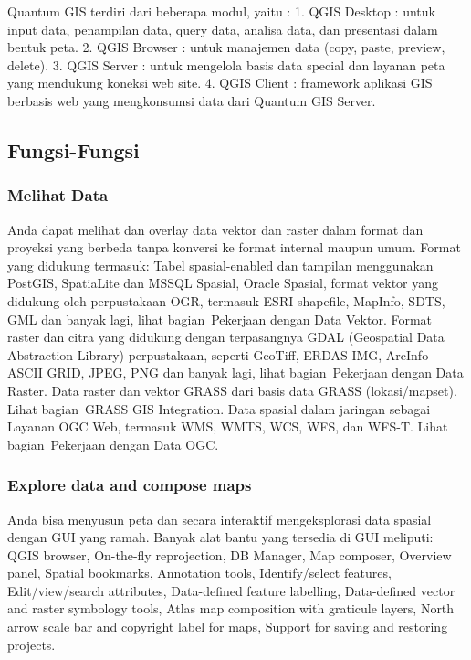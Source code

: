 	Quantum GIS terdiri dari beberapa modul, yaitu :
	1.	QGIS Desktop : untuk input data, penampilan data, query data, analisa data, dan presentasi dalam bentuk peta.
	2.	QGIS Browser : untuk manajemen data (copy, paste, preview, delete).
	3.	QGIS Server : untuk mengelola basis data special dan layanan peta yang mendukung koneksi web site.
	4.	QGIS Client : framework aplikasi GIS berbasis web yang mengkonsumsi data dari Quantum GIS Server.

\subsection{Fungsi-Fungsi}
	\subsubsection {Melihat Data}
	Anda dapat melihat dan overlay data vektor dan raster dalam format dan proyeksi yang berbeda tanpa konversi ke format internal maupun umum. Format yang didukung termasuk:
	Tabel spasial-enabled dan tampilan menggunakan PostGIS, SpatiaLite dan MSSQL Spasial, Oracle Spasial, format vektor yang didukung oleh perpustakaan OGR, termasuk ESRI shapefile, MapInfo, SDTS, GML dan banyak lagi, lihat bagian Pekerjaan dengan Data Vektor.
	Format raster dan citra yang didukung dengan terpasangnya GDAL (Geospatial Data Abstraction Library) perpustakaan, seperti GeoTiff, ERDAS IMG, ArcInfo ASCII GRID, JPEG, PNG dan banyak lagi, lihat bagian Pekerjaan dengan Data Raster.
	Data raster dan vektor GRASS dari basis data GRASS (lokasi/mapset). Lihat bagian GRASS GIS Integration.
	Data spasial dalam jaringan sebagai Layanan OGC Web, termasuk WMS, WMTS, WCS, WFS, dan WFS-T. Lihat bagian Pekerjaan dengan Data OGC.
	\subsubsection {Explore data and compose maps}
	Anda bisa menyusun peta dan secara interaktif mengeksplorasi data spasial dengan GUI yang ramah. Banyak alat bantu yang tersedia di GUI meliputi: QGIS browser, On-the-fly reprojection, DB Manager, Map composer, Overview panel, Spatial bookmarks, Annotation tools, Identify/select features, Edit/view/search attributes, Data-defined feature labelling, Data-defined vector and raster symbology tools, Atlas map composition with graticule layers, North arrow scale bar and copyright label for maps, Support for saving and restoring projects.
